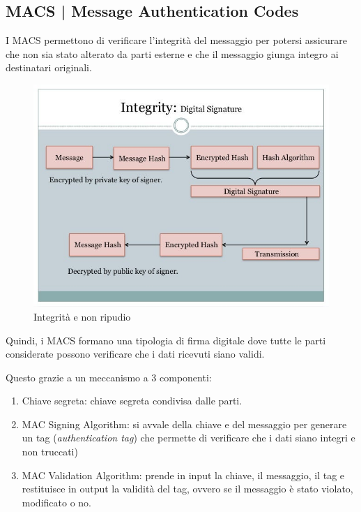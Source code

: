 
\subsection{MACS | Message Authentication Codes}

 

\textsf{\small I MACS permettono di verificare l'integrità del messaggio per potersi assicurare che non sia stato alterato da parti esterne e che il messaggio giunga integro ai destinatari originali.} %

\begin{figure}[H]
	\centering
	\includegraphics[width=.9\textwidth, height=.9\textheight, keepaspectratio]{./images/aes_modes/encryption-integrity-and-nonrepudiation.png}
	\caption{Integrità e non ripudio}
	\label{fig:encryption-integrity-and-nonrepudiation}
\end{figure}


\textsf{\small Quindi, i MACS formano una tipologia di firma digitale dove tutte le parti considerate possono verificare che i dati ricevuti siano validi.}

\textsf{\small Questo grazie a un meccanismo a 3 componenti:}

\begin{enumerate}
	\item \textsf{\small Chiave segreta: chiave segreta condivisa dalle parti.}
	\item \textsf{\small MAC Signing Algorithm: si avvale della chiave e del messaggio per generare un tag (\emph{authentication tag}) che permette di verificare che i dati siano integri e non truccati)}
	\item \textsf{\small MAC Validation Algorithm: prende in input la chiave, il messaggio, il tag e restituisce in output la validità del tag, ovvero se il messaggio è stato violato, modificato o no.}
\end{enumerate}

